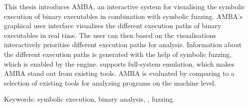 This thesis introduces AMBA, an interactive system for visualising the symbolic execution of binary executables in combination with symbolic fuzzing.
AMBA's graphical user interface visualises the different execution paths of binary executables in real time.
The user can then based on the visualisations interactively prioritise different execution paths for analysis.
Information about the different execution paths is generated with the help of symbolic fuzzing, which is enabled by the \stoe{} engine.
\stoe{} supports full-system emulation, which makes AMBA stand out from existing tools.
AMBA is evaluated by comparing to a selection of existing tools for analyzing programs on the machine level.

Keywords: symbolic execution, binary analysis, \stoe{}, fuzzing.
